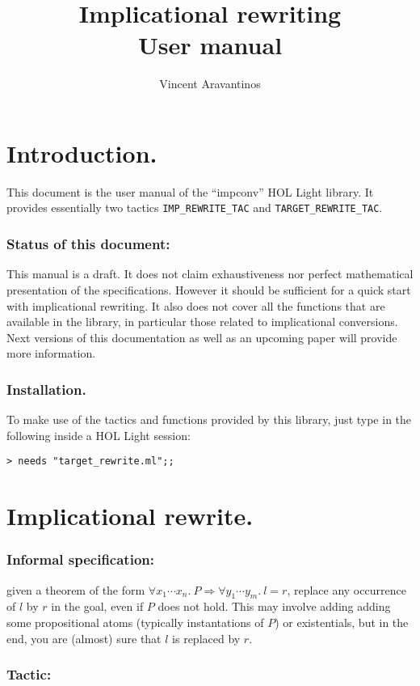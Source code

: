 \documentclass{llncs}
\title{Implicational rewriting\\User manual}
\author{Vincent Aravantinos}
\institute{Hardware Verification Group\\Concordia University}
\newcommand*\IMPREWRITETAC{\texttt{IMP\_REWRITE\_TAC}\xspace}
\begin{document}
  \maketitle

  \section{Introduction.}
		This document is the user manual of the ``impconv'' HOL Light library.
    It provides essentially two tactics \IMPREWRITETAC and \texttt{TARGET\_REWRITE\_TAC}.

	\subsubsection{Status of this document:}
		This manual is a draft. It does not claim exhaustiveness nor perfect mathematical presentation of the specifications.
		However it should be sufficient for a quick start with implicational rewriting.
		It also does not cover all the functions that are available in the library, in particular those related to implicational conversions.
		Next versions of this documentation as well as an upcoming paper will provide more information.

  \subsubsection{Installation.}
    To make use of the tactics and functions provided by this library, just type in the following inside a HOL Light session:

		\bigskip
    \texttt{> needs "target\_rewrite.ml";;}

	\section{Implicational rewrite.}
		\subsubsection{Informal specification:}
		given a theorem of the form $\forall x_1\cdots x_n.\ P \Rightarrow \forall y_1\cdots y_m.\ l = r$,
    replace any occurrence of $l$ by $r$ in the goal, even if $P$ does not hold.
		This may involve adding adding some propositional atoms (typically instantations of $P$) or existentials,
    but in the end, you are (almost) sure that $l$ is replaced by $r$.

		\subsubsection{Tactic:}\ 
\end{document}
